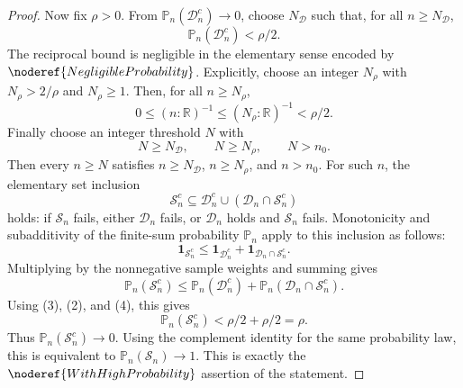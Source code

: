 \begin{proof}
Now fix \(\rho>0\).  From \(\mathbb P_n(\mathcal D_n^c)\to0\), choose
\(N_{\mathcal D}\) such that, for all \(n\ge N_{\mathcal D}\),
\[
\mathbb P_n(\mathcal D_n^c)<\rho/2. \tag{3}
\]
The reciprocal bound is negligible in the elementary sense encoded by
\(\noderef{NegligibleProbability}\).  Explicitly, choose an integer
\(N_{\rho}\) with \(N_{\rho}>2/\rho\) and \(N_{\rho}\ge1\).  Then, for all
\(n\ge N_{\rho}\),
\[
0\le(n:\mathbb R)^{-1}\le (N_{\rho}:\mathbb R)^{-1}<\rho/2. \tag{4}
\]
Finally choose an integer threshold \(N\) with
\[
N\ge N_{\mathcal D},\qquad N\ge N_{\rho},\qquad N>n_0.
\]
Then every \(n\ge N\) satisfies \(n\ge N_{\mathcal D}\), \(n\ge N_{\rho}\),
and \(n>n_0\).  For such \(n\), the elementary set inclusion
\[
\mathcal S_n^c\subseteq \mathcal D_n^c\cup(\mathcal D_n\cap\mathcal S_n^c)
\]
holds: if \(\mathcal S_n\) fails, either \(\mathcal D_n\) fails, or
\(\mathcal D_n\) holds and \(\mathcal S_n\) fails.  Monotonicity and
subadditivity of the finite-sum probability \(\mathbb P_n\) apply to this
inclusion as follows:
\[
\mathbf 1_{\mathcal S_n^c}
\le
\mathbf 1_{\mathcal D_n^c}
+\mathbf 1_{\mathcal D_n\cap\mathcal S_n^c}.
\]
Multiplying by the nonnegative sample weights and summing gives
\[
\mathbb P_n(\mathcal S_n^c)
\le \mathbb P_n(\mathcal D_n^c)
  +\mathbb P_n(\mathcal D_n\cap\mathcal S_n^c).
\]
Using (3), (2), and (4), this gives
\[
\mathbb P_n(\mathcal S_n^c)
< \rho/2+\rho/2=\rho.
\]
Thus \(\mathbb P_n(\mathcal S_n^c)\to0\).  Using the complement identity for
the same probability law, this is equivalent to
\(\mathbb P_n(\mathcal S_n)\to1\).  This is exactly the
\(\noderef{WithHighProbability}\) assertion of the statement.
\end{proof}
